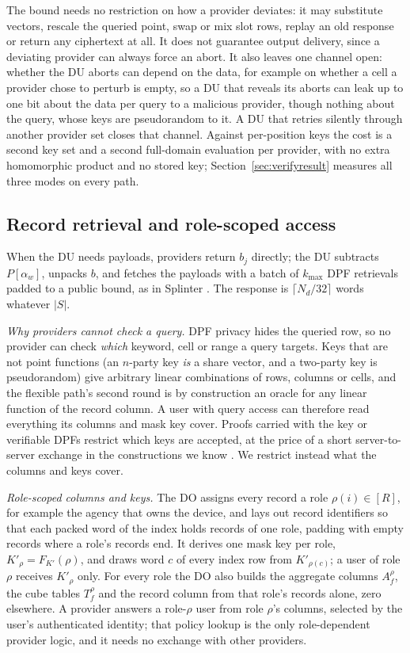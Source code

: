 \documentclass[a4paper,fleqn]{cas-sc}
\begin{document}
The bound needs no restriction on how a provider deviates: it may substitute
vectors, rescale the queried point, swap or mix slot rows, replay an old
response or return any ciphertext at all. It does not guarantee output
delivery, since a deviating provider can always force an abort. It also leaves
one channel open: whether the DU aborts can depend on the data, for example on
whether a cell a provider chose to perturb is empty, so a DU that reveals its
aborts can leak up to one bit about the data per query to a malicious
provider, though nothing about the query, whose keys are pseudorandom to it. A
DU that retries silently through another provider set closes that channel.
Against per-position keys the cost is a second key set and a second full-domain
evaluation per provider, with no extra homomorphic product and no stored key;
Section~\ref{sec:verifyresult} measures all three modes on every path.

\subsection{Record retrieval and role-scoped access}
\label{sec:auth}
When the DU needs payloads, providers return $b_j$ directly; the DU subtracts
$P[\alpha_w]$, unpacks $b$, and fetches the payloads with a batch of
$k_{\max}$ DPF retrievals padded to a public bound, as in Splinter
\citep{splinter}. The response is $\lceil N_d/32\rceil$ words whatever $|S|$.

\emph{Why providers cannot check a query.} DPF privacy hides the queried row,
so no provider can check \emph{which} keyword, cell or range a query targets.
Keys that are not point functions (an $n$-party key \emph{is} a share vector,
and a two-party key is pseudorandom) give arbitrary linear combinations of
rows, columns or cells, and the flexible path's second round is by
construction an oracle for any linear function of the record column. A user
with query access can therefore read everything its columns and mask key
cover. Proofs carried with the key \citep{pacl,ji2023finegrained} or verifiable
DPFs \citep{decastro2022lightweight} restrict which keys are accepted, at the
price of a short server-to-server exchange in the constructions we know
\citep{boneh2021lightweight}. We restrict instead what the columns and keys
cover.

\emph{Role-scoped columns and keys.} The DO assigns every record a role
$\rho(i)\in[R]$, for example the agency that owns the device, and lays out
record identifiers so that each packed word of the index holds records of one
role, padding with empty records where a role's records end. It derives one
mask key per role, $K'_\rho=F_{K'}(\rho)$, and draws word $c$ of every index row
from $K'_{\rho(c)}$; a user of role $\rho$ receives $K'_\rho$ only. For every
role the DO also builds the aggregate columns $A_f^{\rho}$, the cube tables
$T_f^{\rho}$ and the record column from that role's records alone, zero
elsewhere. A provider answers a role-$\rho$ user from role $\rho$'s columns,
selected by the user's authenticated identity; that policy lookup is the only
role-dependent provider logic, and it needs no exchange with other providers.
\end{document}
